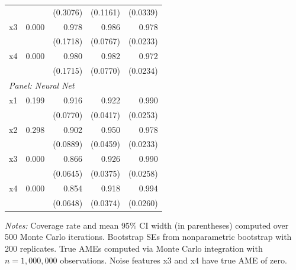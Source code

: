 \documentclass[12pt]{article}
\begin{document}
\begin{table}[htbp]
\begin{threeparttable}
\begin{tabular}{lrrrr}
				&  & (0.3076) & (0.1161) & (0.0339) \\
				\quad x3 & 0.000 & 0.978 & 0.986 & 0.978 \\
				&  & (0.1718) & (0.0767) & (0.0233) \\
				\quad x4 & 0.000 & 0.980 & 0.982 & 0.972 \\
				&  & (0.1715) & (0.0770) & (0.0234) \\
				\midrule
				\multicolumn{5}{l}{\textit{Panel: Neural Net}} \\
				\quad x1 & 0.199 & 0.916 & 0.922 & 0.990 \\
				&  & (0.0770) & (0.0417) & (0.0253) \\
				\quad x2 & 0.298 & 0.902 & 0.950 & 0.978 \\
				&  & (0.0889) & (0.0459) & (0.0233) \\
				\quad x3 & 0.000 & 0.866 & 0.926 & 0.990 \\
				&  & (0.0645) & (0.0375) & (0.0258) \\
				\quad x4 & 0.000 & 0.854 & 0.918 & 0.994 \\
				&  & (0.0648) & (0.0374) & (0.0260) \\
				\bottomrule
			\end{tabular}
			\begin{tablenotes}
				\footnotesize
				\item \textit{Notes:} Coverage rate and mean 95\% CI width (in parentheses) computed over 500 Monte Carlo iterations. Bootstrap SEs from nonparametric bootstrap with 200 replicates. True AMEs computed via Monte Carlo integration with $n=1{,}000{,}000$ observations. Noise features x3 and x4 have true AME of zero.
			\end{tablenotes}
		\end{threeparttable}
	\end{table}
	
\end{document}
